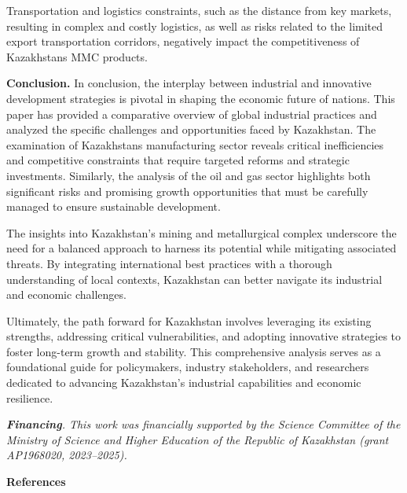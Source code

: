 Transportation and logistics constraints, such as the distance from key
markets, resulting in complex and costly logistics, as well as risks
related to the limited export transportation corridors, negatively
impact the competitiveness of Kazakhstan\textquotesingle s MMC products.

{\bfseries Conclusion.} In conclusion, the interplay between industrial and
innovative development strategies is pivotal in shaping the economic
future of nations. This paper has provided a comparative overview of
global industrial practices and analyzed the specific challenges and
opportunities faced by Kazakhstan. The examination of
Kazakhstan\textquotesingle s manufacturing sector reveals critical
inefficiencies and competitive constraints that require targeted reforms
and strategic investments. Similarly, the analysis of the oil and gas
sector highlights both significant risks and promising growth
opportunities that must be carefully managed to ensure sustainable
development.

The insights into Kazakhstan's mining and metallurgical complex
underscore the need for a balanced approach to harness its potential
while mitigating associated threats. By integrating international best
practices with a thorough understanding of local contexts, Kazakhstan
can better navigate its industrial and economic challenges.

Ultimately, the path forward for Kazakhstan involves leveraging its
existing strengths, addressing critical vulnerabilities, and adopting
innovative strategies to foster long-term growth and stability. This
comprehensive analysis serves as a foundational guide for policymakers,
industry stakeholders, and researchers dedicated to advancing
Kazakhstan's industrial capabilities and economic resilience.

\emph{{\bfseries Financing}. This work was financially supported by the
Science Committee of the Ministry of Science and Higher Education of the
Republic of Kazakhstan (grant AP1968020, 2023--2025).}

{\bfseries References}

